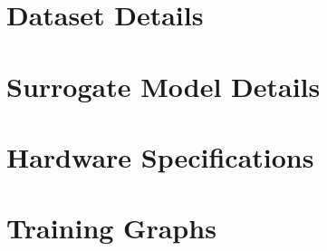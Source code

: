 \documentclass[../main.tex]{subfiles}
\begin{document}
\appendix
\chapter{Dataset Details}

\chapter{Surrogate Model Details}

\chapter{Hardware Specifications}

\chapter{Training Graphs}
\end{document}
